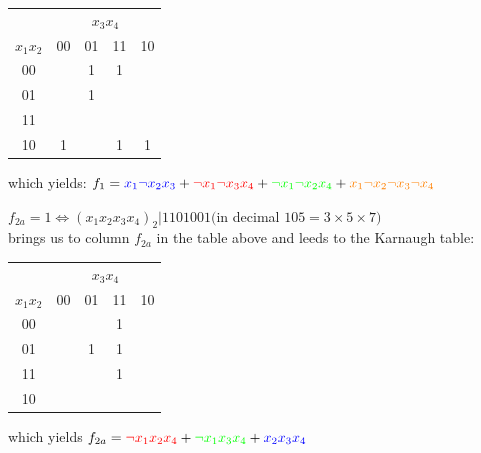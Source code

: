 \documentclass[10pt,a4paper]{scrartcl}
\newcommand{\subExercise}[1]{\vspace{0.5em} \noindent{\bf #1)}}
\begin{document}
\begin{tabular}{|c||c|c|c|c|}
  \hline 
            & \multicolumn{4}{c|}{$x_3x_4$} \\
$x_1x_2$ & 00                  & 01                  & 11                 & 10                \\ \hline
    00   &                     & \cellcolor{yellow}1 & \cellcolor{green}1 &                   \\ \hline
    01   &                     & \cellcolor{red}1    &                    &                   \\ \hline
    11   &                     &                     &                    &                   \\ \hline
    10   & \cellcolor{orange}1 &                     & \cellcolor{blue}1  & \cellcolor{blue}1 \\
  \hline
\end{tabular}
which yields: $f_1 =  \textcolor{blue}{x_1\neg x_2x_3}+
                      \textcolor{red}{\neg x_1\neg x_3x_4}+
                      \textcolor{green}{\neg x_1\neg x_2x_4}+
                      \textcolor{orange}{x_1\neg x_2\neg x_3\neg x_4}$

                      
                      
\subExercise{a2}
$f_{2a} = 1 \Leftrightarrow (x_1x_2x_3x_4)_2 | 1101001 ($in decimal $105=3\times5\times7)$\\
brings us to column $f_{2a}$ in the table above and leeds to the Karnaugh table:\\
\begin{tabular}{|c||c|c|c|c|}
  \hline 
            & \multicolumn{4}{c|}{$x_3x_4$} \\
$x_1x_2$ & 00                  & 01                  & 11                 & 10                \\ \hline
    00   &                     &                     & \cellcolor{green}1 &                   \\ \hline
    01   &                     & \cellcolor{red}1    & \cellcolor{gray}1  &                   \\ \hline
    11   &                     &                     & \cellcolor{blue}1  &                   \\ \hline
    10   &                     &                     &                    &                   \\
  \hline
\end{tabular}
which yields $f_{2a} = \textcolor{red}{\neg x_1x_2x_4}+
                       \textcolor{green}{\neg x_1x_3x_4}+
                       \textcolor{blue}{x_2x_3x_4}$
\end{document}

